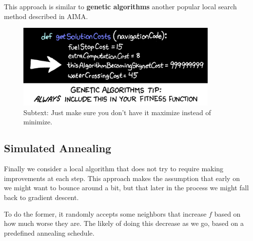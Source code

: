 \documentclass[11pt]{article}
\begin{document}
\begin{algorithm}[h]
\begin{algorithmic}[1]
  
  \EndFor
  \EndIf{}
  \EndFor{}
  \EndFor{}
  \EndFor{}
  \EndFor{}
  \EndProcedure{}
\end{algorithmic}
\end{algorithm}

This approach is similar to \textbf{genetic algorithms} another popular local search method described in AIMA.

\begin{figure}[h]
  \centering
  \includegraphics[width=10cm]{pics/genetic_algorithms}
  \caption{Subtext: Just make sure you don't have it maximize instead of minimize.}
\end{figure}

\subsection{Simulated Annealing}

Finally we consider a local algorithm that does not try to require making improvements at each step. This approach makes the assumption that early on we might want to bounce around a bit, but that later in the process we might fall back to gradient descent. 

To do the former, it randomly accepts some neighbors that increase $f$ based on how much worse they are. The likely of doing this decrease as we go, based on a predefined annealing schedule.
\end{document}
